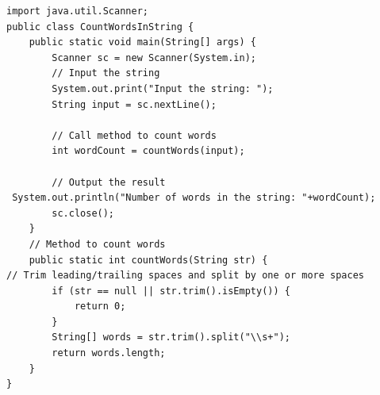 \begin{verbatim}
import java.util.Scanner;
public class CountWordsInString {
    public static void main(String[] args) {
        Scanner sc = new Scanner(System.in);
        // Input the string
        System.out.print("Input the string: ");
        String input = sc.nextLine();

        // Call method to count words
        int wordCount = countWords(input);

        // Output the result
 System.out.println("Number of words in the string: "+wordCount);
        sc.close();
    }
    // Method to count words
    public static int countWords(String str) {
// Trim leading/trailing spaces and split by one or more spaces
        if (str == null || str.trim().isEmpty()) {
            return 0;
        }
        String[] words = str.trim().split("\\s+");
        return words.length;
    }
}
\end{verbatim}